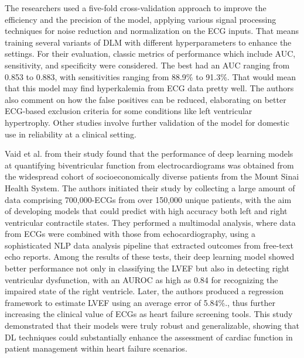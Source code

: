 \vspace{0.5cm}
The researchers used a five-fold cross-validation approach to improve the efficiency and the precision of the model, applying various signal processing techniques for noise reduction and normalization on the ECG inputs. That means training several variants of DLM with different hyperparameters to enhance the settings. For their evaluation, classic metrics of performance which include AUC, sensitivity, and specificity were considered. The best had an AUC ranging from 0.853 to 0.883, with sensitivities ranging from 88.9\% to 91.3\%. That would mean that this model may find hyperkalemia from ECG data pretty well. The authors also comment on how the false positives can be reduced, elaborating on better ECG-based exclusion criteria for some conditions like left ventricular hypertrophy. Other studies involve further validation of the model for domestic use in reliability at a clinical setting.
 
\vspace{0.5cm}


Vaid et al.\cite{VAID2022395} from their study found that the performance of deep learning models at quantifying biventricular function from electrocardiograms was obtained from the widespread cohort of socioeconomically diverse patients from the Mount Sinai Health System. The authors initiated their study by collecting a large amount of data comprising 700,000-ECGs from over 150,000 unique patients, with the aim of developing models that could predict with high accuracy both left and right ventricular contractile states. They performed a multimodal analysis, where data from ECGs were combined with those from echocardiography, using a sophisticated NLP data analysis pipeline that extracted outcomes from free-text echo reports. Among the results of these tests, their deep learning model showed better performance not only in classifying the LVEF but also in detecting right ventricular dysfunction, with an AUROC as high as 0.84 for recognizing the impaired state of the right ventricle. Later, the authors produced a regression framework to estimate LVEF using an average error of 5.84\%., thus further increasing the clinical value of ECGs as heart failure screening tools. This study demonstrated that their models were truly robust and generalizable, showing that DL techniques could substantially enhance the assessment of cardiac function in patient management within heart failure scenarios. 
 
